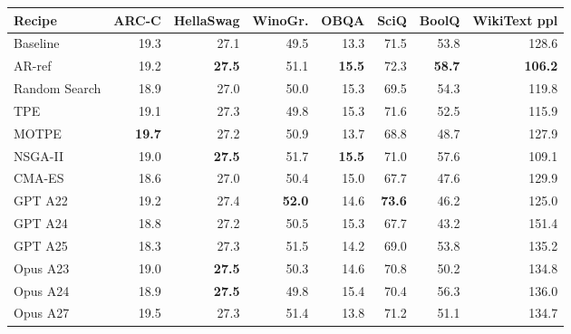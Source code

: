 \begin{tabular}{@{}lrrrrrrr@{}}
\toprule
Recipe & ARC-C & HellaSwag & WinoGr. & OBQA & SciQ & BoolQ & WikiText ppl \\
\midrule
Baseline & 19.3 & 27.1 & 49.5 & 13.3 & 71.5 & 53.8 & 128.6 \\
AR-ref & 19.2 & \textbf{27.5} & 51.1 & \textbf{15.5} & 72.3 & \textbf{58.7} & \textbf{106.2} \\
Random Search & 18.9 & 27.0 & 50.0 & 15.3 & 69.5 & 54.3 & 119.8 \\
TPE & 19.1 & 27.3 & 49.8 & 15.3 & 71.6 & 52.5 & 115.9 \\
MOTPE & \textbf{19.7} & 27.2 & 50.9 & 13.7 & 68.8 & 48.7 & 127.9 \\
NSGA-II & 19.0 & \textbf{27.5} & 51.7 & \textbf{15.5} & 71.0 & 57.6 & 109.1 \\
CMA-ES & 18.6 & 27.0 & 50.4 & 15.0 & 67.7 & 47.6 & 129.9 \\
GPT A22 & 19.2 & 27.4 & \textbf{52.0} & 14.6 & \textbf{73.6} & 46.2 & 125.0 \\
GPT A24 & 18.8 & 27.2 & 50.5 & 15.3 & 67.7 & 43.2 & 151.4 \\
GPT A25 & 18.3 & 27.3 & 51.5 & 14.2 & 69.0 & 53.8 & 135.2 \\
Opus A23 & 19.0 & \textbf{27.5} & 50.3 & 14.6 & 70.8 & 50.2 & 134.8 \\
Opus A24 & 18.9 & \textbf{27.5} & 49.8 & 15.4 & 70.4 & 56.3 & 136.0 \\
Opus A27 & 19.5 & 27.3 & 51.4 & 13.8 & 71.2 & 51.1 & 134.7 \\
\bottomrule
\end{tabular}
